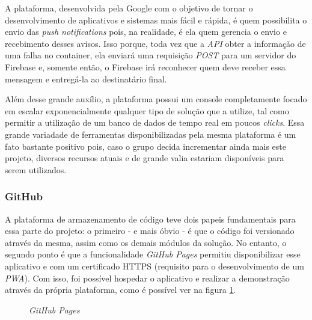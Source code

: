A plataforma, desenvolvida pela Google com o objetivo de tornar o desenvolvimento de aplicativos e sistemas mais fácil e rápida, é quem possibilita o envio das \textit{push notifications} pois, na realidade, é ela quem gerencia o envio e recebimento desses avisos. Isso porque, toda vez que a \textit{API} obter a informação de uma falha no container, ela enviará uma requisição \textit{POST} para um servidor do Firebase e, somente então, o Firebase irá reconhecer quem deve receber essa mensagem e entregá-la ao destinatário final.

Além desse grande auxílio, a plataforma possui um console completamente focado em escalar exponencialmente qualquer tipo de solução que a utilize, tal como permitir a utilização de um banco de dados de tempo real em poucos \textit{clicks}. Essa grande variadade de ferramentas disponibilizadas pela mesma plataforma é um fato bastante positivo pois, caso o grupo decida incrementar ainda mais este projeto, diversos recursos atuais e de grande valia estariam disponíveis para serem utilizados.


\subsubsection{GitHub}
\label{subsubsec:github}

A plataforma de armazenamento de código teve dois papeis fundamentais para essa parte do projeto: o primeiro - e mais óbvio - é que o código foi versionado através da mesma, assim como os demais módulos da solução. No entanto, o segundo ponto é que a funcionalidade \textit{GitHub Pages} permitiu disponibilizar esse aplicativo \online{} e com um certificado HTTPS (requisito para o desenvolvimento de um \textit{PWA}). Com isso, foi possível hospedar o aplicativo e realizar a demonstração através da própria plataforma, como é possível ver na figura \ref{fig:github_pages}.

\begin{figure}[H]
    \centering
    \caption{\textit{GitHub Pages}}
    \label{fig:github_pages}
\end{figure}


